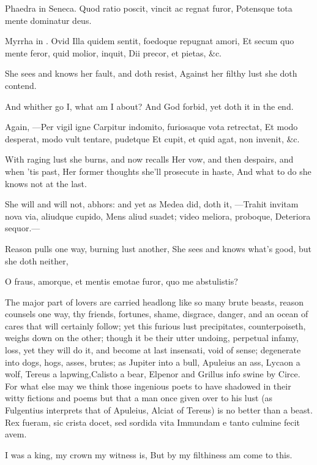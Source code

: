 {Phaedra in Seneca.
Quod ratio poscit, vincit ac regnat furor,
Potensque tota mente dominatur deus.

Myrrha in . Ovid
Illa quidem sentit, foedoque repugnat amori,
Et secum quo mente feror, quid molior, inquit,
Dii precor, et pietas, \&c.


She sees and knows her fault, and doth resist,
Against her filthy lust she doth contend.

And whither go I, what am I about?
And God forbid, yet doth it in the end.

Again,
---Per vigil igne
Carpitur indomito, furiosaque vota retrectat,
Et modo desperat, modo vult tentare, pudetque
Et cupit, et quid agat, non invenit, \&c.

With raging lust she burns, and now recalls
Her vow, and then despairs, and when 'tis past,
Her former thoughts she'll prosecute in haste,
And what to do she knows not at the last.

She will and will not, abhors: and yet as Medea did, doth it,
---Trahit invitam nova via, aliudque cupido,
Mens aliud suadet; video meliora, proboque,
Deteriora sequor.---

Reason pulls one way, burning lust another,
She sees and knows what's good, but she doth neither,

O fraus, amorque, et mentis emotae furor,
quo me abstulistis?

The major part of lovers are carried headlong like so many brute
beasts, reason counsels one way, thy friends, fortunes, shame,
disgrace, danger, and an ocean of cares that will certainly follow; yet
this furious lust precipitates, counterpoiseth, weighs down on the
other; though it be their utter undoing, perpetual infamy, loss, yet
they will do it, and become at last insensati, void of sense;
degenerate into dogs, hogs, asses, brutes; as Jupiter into a bull,
Apuleius an ass, Lycaon a wolf, Tereus a lapwing,Calisto a bear,
Elpenor and Grillus info swine by Circe. For what else may we think
those ingenious poets to have shadowed in their witty fictions and
poems but that a man once given over to his lust (as Fulgentius
interprets that of Apuleius, Alciat of Tereus) is no better than a
beast.
Rex fueram, sic crista docet, sed sordida vita
Immundam e tanto culmine fecit avem.

I was a king, my crown my witness is,
But by my filthiness am come to this.

}
